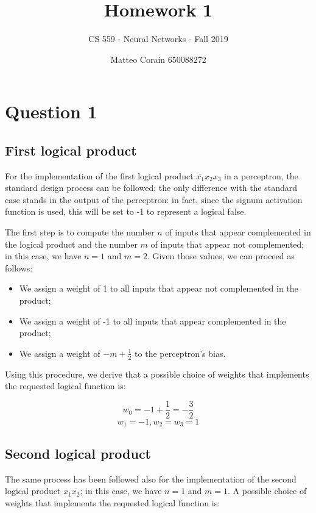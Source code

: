 \documentclass[letterpaper,headings=standardclasses]{scrartcl}
\title{Homework 1}
\subtitle{CS 559 - Neural Networks - Fall 2019}
\author{Matteo Corain 650088272}
\begin{document}
\maketitle

\section{Question 1}

\subsection{First logical product}

For the implementation of the first logical product $\bar{x_1} x_2 x_3$ in a perceptron, the standard design process can be followed; the only difference with the standard case stands in the output of the perceptron: in fact, since the signum activation function is used, this will be set to -1 to represent a logical false.

The first step is to compute the number $n$ of inputs that appear complemented in the logical product and the number $m$ of inputs that appear not complemented; in this case, we have $ n = 1 $ and $ m = 2 $. Given those values, we can proceed as follows:

\begin{itemize}

\item We assign a weight of 1 to all inputs that appear not complemented in the product;
\item We assign a weight of -1 to all inputs that appear complemented in the product;
\item We assign a weight of $-m + \frac{1}{2}$ to the perceptron's bias.

\end{itemize}

Using this procedure, we derive that a possible choice of weights that implements the requested logical function is:

$$ w_0 = -1 + \frac{1}{2} = -\frac{3}{2} $$
$$ w_1 = -1, w_2 = w_3 = 1 $$

\subsection{Second logical product}

The same process has been followed also for the implementation of the second logical product $ x_1 \bar{x_2} $; in this case, we have $ n = 1 $ and $ m = 1 $. A possible choice of weights that implements the requested logical function is:
\end{document}
